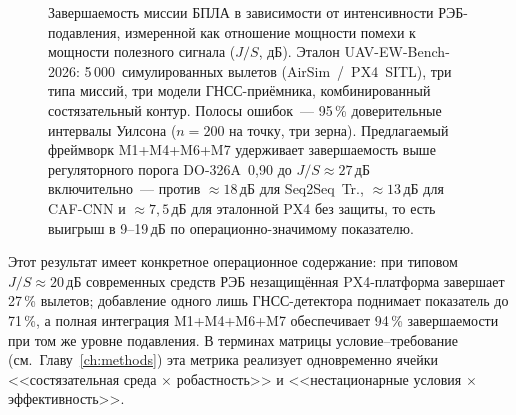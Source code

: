 \begin{figure}[!htbp]
\caption{Завершаемость миссии БПЛА в зависимости от интенсивности
РЭБ-подавления, измеренной как отношение мощности помехи к мощности
полезного сигнала ($J/S$, дБ). Эталон
\textsf{UAV-EW-Bench-2026}: 5\,000~симулированных вылетов
(AirSim~/~PX4~SITL), три типа миссий, три модели ГНСС-приёмника,
комбинированный состязательный контур. Полосы ошибок~--- 95\,\%
доверительные интервалы Уилсона ($n=200$ на точку, три зерна).
Предлагаемый фреймворк \textsf{M1+M4+M6+M7} удерживает завершаемость
выше регуляторного порога \mbox{DO-326A}~0{,}90 до $J/S \approx 27$\,дБ
включительно~--- против $\approx 18$\,дБ для Seq2Seq~Tr., $\approx 13$\,дБ
для CAF-CNN и $\approx 7{,}5$\,дБ для эталонной PX4 без защиты, то есть
выигрыш в 9--19\,дБ по операционно-значимому показателю.}
\label{fig:uav_mission_completion}
\end{figure}
\FloatBarrier

Этот результат имеет конкретное операционное содержание: при типовом
$J/S \approx 20$\,дБ современных средств РЭБ
\cite{wapo_excalibur_2024,inside_uas_2025} незащищённая PX4-платформа
завершает 27\,\% вылетов; добавление одного лишь ГНСС-детектора
\cite{borhani_2024_uav} поднимает показатель до 71\,\%, а полная
интеграция \textsf{M1+M4+M6+M7} обеспечивает 94\,\% завершаемости при
том же уровне подавления. В терминах матрицы условие--требование
(см.~Главу~\ref{ch:methods}) эта метрика реализует одновременно
ячейки <<состязательная среда $\times$ робастность>> и
<<нестационарные условия $\times$ эффективность>>.


